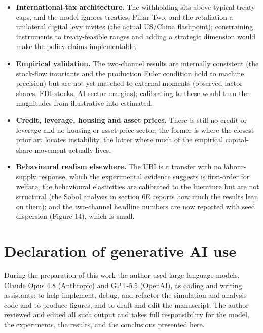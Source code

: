 \documentclass[12pt]{article}
\providecommand{\tightlist}{\setlength{\itemsep}{0pt}\setlength{\parskip}{0pt}}
\begin{document}
\begin{itemize}
\tightlist
\item
  \textbf{International-tax architecture.} The withholding sits above
  typical treaty caps, and the model ignores treaties, Pillar Two, and
  the retaliation a unilateral digital levy invites (the actual US/China
  flashpoint); constraining instruments to treaty-feasible ranges and
  adding a strategic dimension would make the policy claims
  implementable.
\item
  \textbf{Empirical validation.} The two-channel results are internally
  consistent (the stock-flow invariants and the production Euler
  condition hold to machine precision) but are not yet matched to
  external moments (observed factor shares, FDI stocks, AI-sector
  margins); calibrating to these would turn the magnitudes from
  illustrative into estimated.
\item
  \textbf{Credit, leverage, housing and asset prices.} There is still no
  credit or leverage and no housing or asset-price sector; the former is
  where the closest prior art locates instability, the latter where much
  of the empirical capital-share movement actually lives.
\item
  \textbf{Behavioural realism elsewhere.} The UBI is a transfer with no
  labour-supply response, which the experimental evidence suggests is
  first-order for welfare; the behavioural elasticities are calibrated
  to the literature but are not structural (the Sobol analysis in
  section 6E reports how much the results lean on them); and the
  two-channel headline numbers are now reported with seed dispersion
  (Figure 14), which is small.
\end{itemize}

\hypertarget{refs}{}



\section*{Declaration of generative AI use}
During the preparation of this work the author used large language models, Claude Opus 4.8 (Anthropic) and GPT-5.5 (OpenAI), as coding and writing assistants: to help implement, debug, and refactor the simulation and analysis code and to produce figures, and to draft and edit the manuscript. The author reviewed and edited all such output and takes full responsibility for the model, the experiments, the results, and the conclusions presented here.
\end{document}
